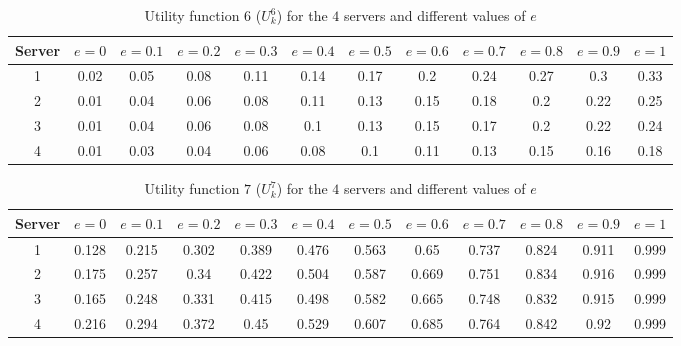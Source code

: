 \begin{table}[H]
    \caption{Utility function \(6\) (\(U_k^6\)) for the \(4\) servers and
    different values of \(e\)}
    \label{tab:case_study_utility_6_all_servers}
    \begin{adjustbox}{width=\columnwidth,center}
        \begin{tabular}{|c|c|c|c|c|c|c|c|c|c|c|c|}
            \hline
            Server & \(e = 0\) & \(e = 0.1\) & \(e = 0.2\) & \(e = 0.3\)
                   & \(e = 0.4\) & \(e = 0.5\) & \(e = 0.6\) & \(e = 0.7\)
                   & \(e = 0.8\) & \(e = 0.9\) & \(e = 1\) \\
            \hline
            1 & 0.02 & 0.05 & 0.08 & 0.11 & 0.14 & 0.17 & 0.2 & 0.24
            & 0.27 & 0.3 & 0.33 \\ 
            2 & 0.01 & 0.04 & 0.06 & 0.08 & 0.11 & 0.13 & 0.15 & 0.18
            & 0.2 & 0.22 & 0.25 \\ 
            3 & 0.01 & 0.04 & 0.06 & 0.08 & 0.1 & 0.13 & 0.15 & 0.17
            & 0.2 & 0.22 & 0.24 \\ 
            4 & 0.01 & 0.03 & 0.04 & 0.06 & 0.08 & 0.1 & 0.11 & 0.13
            & 0.15 & 0.16 & 0.18 \\ 
            \hline
        \end{tabular}
    \end{adjustbox}
\end{table}

\begin{table}[H]
    \caption{Utility function \(7\) (\(U_k^7\)) for the \(4\) servers and
    different values of \(e\)}
    \label{tab:case_study_utility_7_all_servers}
    \begin{adjustbox}{width=\columnwidth,center}
        \begin{tabular}{|c|c|c|c|c|c|c|c|c|c|c|c|}
            \hline
            Server & \(e = 0\) & \(e = 0.1\) & \(e = 0.2\) & \(e = 0.3\)
                   & \(e = 0.4\) & \(e = 0.5\) & \(e = 0.6\) & \(e = 0.7\)
                   & \(e = 0.8\) & \(e = 0.9\) & \(e = 1\) \\
            \hline
            1 & 0.128 & 0.215 & 0.302 & 0.389 & 0.476 & 0.563 & 0.65 & 0.737
            & 0.824 & 0.911 & 0.999 \\ 
            2 & 0.175 & 0.257 & 0.34 & 0.422 & 0.504 & 0.587 & 0.669 & 0.751
            & 0.834 & 0.916 & 0.999 \\ 
            3 & 0.165 & 0.248 & 0.331 & 0.415 & 0.498 & 0.582 & 0.665 & 0.748
            & 0.832 & 0.915 & 0.999 \\ 
            4 & 0.216 & 0.294 & 0.372 & 0.45 & 0.529 & 0.607 & 0.685 & 0.764
            & 0.842 & 0.92 & 0.999 \\ 
            \hline
        \end{tabular}
    \end{adjustbox}
\end{table}

